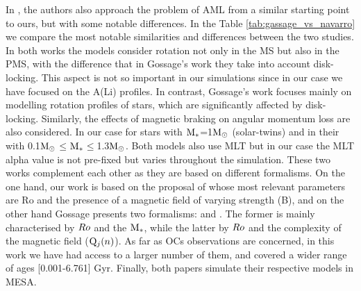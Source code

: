 \documentclass[fleqn,usenatbib]{mnras}
\begin{document}
In \cite{Gossage2021}, the authors also approach the problem of AML from a similar starting point to ours, but with some notable differences. In the Table \ref{tab:gassage_vs_navarro} we compare the most notable similarities and differences between the two studies. In both works the models consider rotation not only in the MS but also in the PMS, with the difference that in Gossage's work they take into account disk-locking. This aspect is not so important in our simulations since in our case we have focused on the A(Li) profiles. In contrast, Gossage's work focuses mainly on modelling rotation profiles of stars, which are significantly affected by disk-locking. Similarly, the effects of magnetic braking on angular momentum loss are also considered. In our case for stars with $\mathrm{M}_*$=1$\mathrm{M}_\odot$ (solar-twins) and in their with 0.1$\mathrm{M}_\odot$$\le$$\mathrm{M}_*$$\le$1.3$\mathrm{M}_\odot$. Both models also use MLT but in our case the MLT alpha value is not pre-fixed but varies throughout the simulation. These two works complement each other as they are based on different formalisms. On the one hand, our work is based on the proposal of \cite{Gallet2013} whose most relevant parameters are Ro and the presence of a magnetic field of varying strength (B), and on the other hand Gossage presents two formalisms: \cite{Matt2015} and \cite{Garraffo2018}. The former is mainly characterised by $Ro$ and the $\mathrm{M}_*$, while the latter by $Ro$ and the complexity of the magnetic field ($\mathrm{Q}_j(n)$). As far as OCs observations are concerned, in this work we have had access to a larger number of them, and covered a wider range of ages [0.001-6.761] Gyr. Finally, both papers simulate their respective models in MESA.\par
\end{document}
